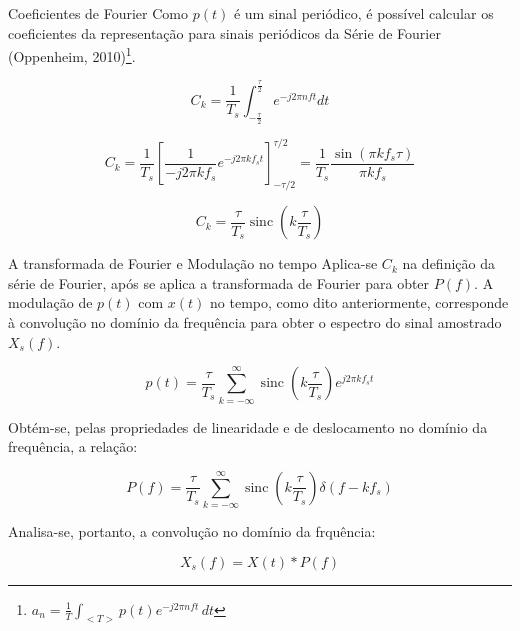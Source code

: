 \documentclass{beamer}
\begin{document}
\begin{frame}{Coeficientes de Fourier}
    Como $p(t)$ é um sinal periódico, é possível calcular os coeficientes da representação para sinais periódicos da Série de Fourier (Oppenheim, 2010)\footnote{$a_n=\frac{1}{T}\int_{<T>}p(t)e^{-j2\pi nf t}\,dt$}.

    \begin{equation}
        C_k=\frac{1}{T_s}\int_{-\frac{\tau}{2}}^{\frac{\tau}{2}}e^{-j2\pi nf t}dt
    \end{equation}

    \begin{equation}
        C_k=\frac{1}{T_s}
        \left[
        \frac{1}{-j2\pi kf_s}e^{-j2\pi kf_s t}
        \right]_{-\tau/2}^{\tau/2} = \frac{1}{T_s}\frac{\sin(\pi kf_s\tau)}{\pi kf_s}
    \end{equation}

    \begin{equation}
        C_k = \frac{\tau}{T_s}\operatorname{sinc}\left(k\frac{\tau}{T_s}\right)
    \end{equation}
\end{frame}

\begin{frame}{A transformada de Fourier e Modulação no tempo}
    Aplica-se $C_k$ na definição da série de Fourier, após se aplica a transformada de Fourier para obter $P(f)$. A modulação de $p(t)$ com $x(t)$ no tempo, como dito anteriormente, corresponde à convolução no domínio da frequência para obter o espectro do sinal amostrado $X_s(f)$. 

    \begin{equation}
        p(t)=\frac{\tau}{T_s}\sum_{k=-\infty}^{\infty}\operatorname{sinc}\left(k\frac{\tau}{T_s}\right)e^{j2\pi kf_s t}
    \end{equation}

    Obtém-se, pelas propriedades de linearidade e de deslocamento no domínio da frequência, a relação:

    \begin{equation}
        P(f)=\frac{\tau}{T_s}\sum_{k=-\infty}^{\infty}\operatorname{sinc}\left(k\frac{\tau}{T_s}\right)\delta(f-kf_s)
    \end{equation}

    Analisa-se, portanto, a convolução no domínio da frquência:

    \begin{equation}
        X_s(f) = X(t) * P(f)
    \end{equation}
        
\end{frame}
\end{document}
